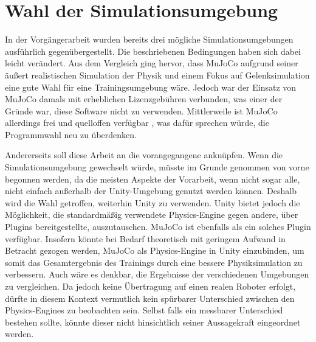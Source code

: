 \section{Wahl der Simulationsumgebung}
In der Vorgängerarbeit wurden bereits drei mögliche Simulationsumgebungen ausführlich gegenübergestellt. \cite[27]{waidner.2020}
Die beschriebenen Bedingungen haben sich dabei leicht verändert.
Aus dem Vergleich ging hervor, dass MuJoCo aufgrund seiner äußert realistischen Simulation der Physik und einem Fokus auf Gelenksimulation eine gute Wahl für eine Trainingsumgebung wäre.
Jedoch war der Einsatz von MuJoCo damals mit erheblichen Lizenzgebühren verbunden, was einer der Gründe war, diese Software nicht zu verwenden.
Mittlerweile ist MuJoCo allerdings frei und quelloffen verfügbar \cite{mujoco.org,github.mujoco}, was dafür sprechen würde, die Programmwahl neu zu überdenken.

Andererseits soll diese Arbeit an die vorangegangene anknüpfen.
Wenn die Simulationsumgebung gewechselt würde, müsste im Grunde genommen von vorne begonnen werden, da die meisten Aspekte der Vorarbeit, wenn nicht sogar alle, nicht einfach außerhalb der Unity-Umgebung genutzt werden können.
Deshalb wird die Wahl getroffen, weiterhin Unity zu verwenden.
Unity bietet jedoch die Möglichkeit, die standardmäßig verwendete Physics-Engine gegen andere, über Plugins bereitgestellte, auszutauschen.
MuJoCo ist ebenfalls als ein solches Plugin verfügbar. \cite{mujocoUnityPlugin}
Insofern könnte bei Bedarf theoretisch mit geringem Aufwand in Betracht gezogen werden, MuJoCo als Physics-Engine in Unity einzubinden, um somit das Gesamtergebnis des Trainings durch eine bessere Physiksimulation zu verbessern.
Auch wäre es denkbar, die Ergebnisse der verschiedenen Umgebungen zu vergleichen.
Da jedoch keine Übertragung auf einen realen Roboter erfolgt, dürfte in diesem Kontext vermutlich kein spürbarer Unterschied zwischen den Physics-Engines zu beobachten sein.
Selbst falls ein messbarer Unterschied bestehen sollte, könnte dieser nicht hinsichtlich seiner Aussagekraft eingeordnet werden.



